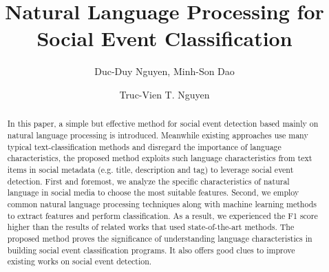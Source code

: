 \documentclass{llncs}
\begin{document}
\title{Natural Language Processing for Social Event Classification}
%

\author{Duc-Duy Nguyen, Minh-Son Dao \and Truc-Vien T. Nguyen}

\maketitle
%

%
%
%

%

\begin{abstract}
In this paper, a simple but effective method for social event detection based mainly on natural language processing is introduced. Meanwhile existing approaches use many typical text-classification methods and disregard the importance of language characteristics, the proposed method exploits such language characteristics from text items in social metadata (e.g. title, description and tag) to leverage social event detection. First and foremost, we analyze the specific characteristics of natural language in social media to choose the most suitable features. Second, we employ common natural language processing techniques along with machine learning methods to extract features and perform classification. As a result, we experienced the F1 score higher than the results of related works that used state-of-the-art methods. The proposed method proves the significance of understanding language characteristics in building social event classification programs. It also offers good clues to improve existing works on social event detection.

\end{abstract}
%
\end{document}
